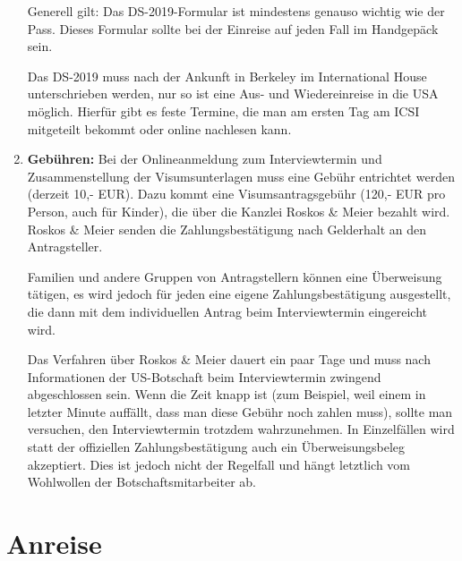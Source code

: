 \documentclass[a4paper]{scrreprt}
\begin{document}
\begin{enumerate}
	Generell gilt: Das DS-2019-Formular ist mindestens genauso wichtig wie der Pass. Dieses Formular sollte bei der
Einreise auf jeden Fall im Handgepäck sein.
	
	Das DS-2019 muss nach der Ankunft in Berkeley im International House unterschrieben werden, nur so ist eine Aus- und Wiedereinreise in die USA m\"oglich. Hierfür gibt es feste Termine, die man am ersten Tag am ICSI mitgeteilt bekommt oder online nachlesen kann.

	\item \textbf{Gebühren:} Bei der Onlineanmeldung zum Interviewtermin und Zusammenstellung der Visumsunterlagen muss eine Gebühr entrichtet werden (derzeit 10,- EUR). Dazu kommt eine Visumsantragsgebühr (120,- EUR pro Person, auch für Kinder), die über die Kanzlei Roskos \& Meier bezahlt wird. Roskos \& Meier senden die Zahlungsbestätigung nach Gelderhalt an den Antragsteller.

	Familien und andere Gruppen von Antragstellern können eine Überweisung tätigen, es wird jedoch für jeden eine eigene Zahlungsbestätigung ausgestellt, die dann mit dem individuellen Antrag beim Interviewtermin eingereicht wird.
	
	Das Verfahren über Roskos \& Meier dauert ein paar Tage und muss nach Informationen der US-Botschaft beim Interviewtermin zwingend abgeschlossen sein. Wenn die Zeit knapp ist (zum Beispiel, weil einem in letzter Minute auffällt, dass man diese Gebühr noch zahlen muss), sollte man versuchen, den Interviewtermin trotzdem wahrzunehmen. In Einzelfällen wird statt der offiziellen Zahlungsbestätigung auch ein Überweisungsbeleg akzeptiert. Dies ist jedoch nicht der Regelfall und hängt letztlich vom Wohlwollen der Botschaftsmitarbeiter ab.
	
\end{enumerate}

\section{Anreise}
\end{document}
